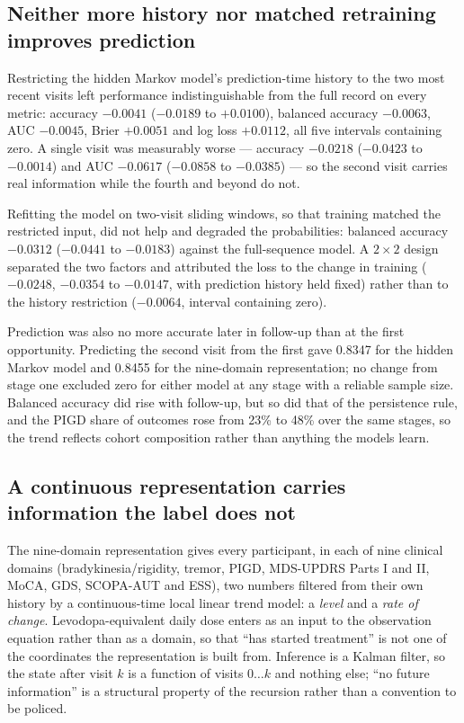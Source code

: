 \documentclass[journal]{IEEEtran}
\begin{document}
\subsection{Neither more history nor matched retraining improves prediction}

Restricting the hidden Markov model's prediction-time history to the two most
recent visits left performance indistinguishable from the full record on every
metric: accuracy $-0.0041$ ($-0.0189$ to $+0.0100$), balanced accuracy
$-0.0063$, AUC $-0.0045$, Brier $+0.0051$ and log loss $+0.0112$, all five
intervals containing zero. A single visit was measurably worse --- accuracy
$-0.0218$ ($-0.0423$ to $-0.0014$) and AUC $-0.0617$ ($-0.0858$ to $-0.0385$) ---
so the second visit carries real information while the fourth and beyond do not.

Refitting the model on two-visit sliding windows, so that training matched the
restricted input, did not help and degraded the probabilities: balanced accuracy
$-0.0312$ ($-0.0441$ to $-0.0183$) against the full-sequence model. A $2\times2$
design separated the two factors and attributed the loss to the change in
training ($-0.0248$, $-0.0354$ to $-0.0147$, with prediction history held fixed)
rather than to the history restriction ($-0.0064$, interval containing zero).

Prediction was also no more accurate later in follow-up than at the first
opportunity. Predicting the second visit from the first gave 0.8347 for the
hidden Markov model and 0.8455 for the nine-domain representation; no change
from stage one excluded zero for either model at any stage with a reliable
sample size. Balanced accuracy did rise with follow-up, but so did that of the
persistence rule, and the PIGD share of outcomes rose from 23\% to 48\% over the
same stages, so the trend reflects cohort composition rather than anything the
models learn.

\subsection{A continuous representation carries information the label does not}
\label{sec:profile}

The nine-domain representation gives every participant, in each of nine clinical
domains (bradykinesia/rigidity, tremor, PIGD, MDS-UPDRS Parts I and II, MoCA,
GDS, SCOPA-AUT and ESS), two numbers filtered from their own history by a
continuous-time local linear trend model: a \emph{level} and a \emph{rate of
change}. Levodopa-equivalent daily dose enters as an input to the observation
equation rather than as a domain, so that ``has started treatment'' is not one
of the coordinates the representation is built from. Inference is a Kalman
filter, so the state after visit $k$ is a function of visits $0\ldots k$ and
nothing else; ``no future information'' is a structural property of the
recursion rather than a convention to be policed.
\end{document}
